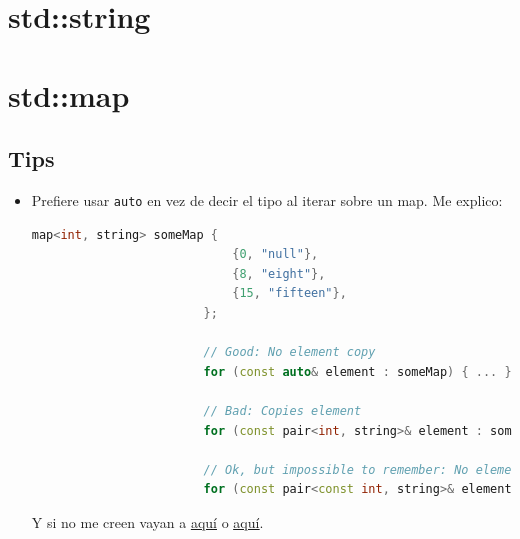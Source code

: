 \documentclass[12pt, fleqn]{report}                             %
\theoremstyle{break}                                            %
\newcommand{\textCode}[1]  { \texttt{#1} }                      %
\begin{document}
        
        \section{std::string}


        \section{std::map}

            \subsection{Tips}

            \begin{itemize}
                \item 
                    Prefiere usar \textCode{auto} en vez de decir el tipo al iterar sobre un map.
                    Me explico:
                    \begin{lstlisting}[language=C++, gobble=24]
                        map<int, string> someMap {
                            {0, "null"},
                            {8, "eight"},
                            {15, "fifteen"},
                        };
                        
                        // Good: No element copy
                        for (const auto& element : someMap) { ... } 
                        
                        // Bad: Copies element
                        for (const pair<int, string>& element : someMap) {...}   

                        // Ok, but impossible to remember: No element copy
                        for (const pair<const int, string>& element : someMap) {...}  
                    \end{lstlisting}

                    Y si no me creen vayan a \underline{\href{https://wandbox.org/permlink/4IFbZr72RfUUWyCz}{aquí}}
                    o \underline{\href{https://releases.llvm.org/7.0.0/tools/clang/tools/extra/docs/clang-tidy/checks/performance-implicit-conversion-in-loop.html}{aquí}}.

                    \cite{NicoJosuttis}

            \end{itemize}
\end{document}
